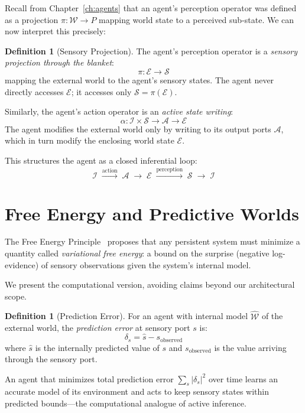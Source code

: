 \documentclass[11pt,a4paper,openany]{book}
\theoremstyle{plain}
\theoremstyle{definition}
\newtheorem{definition}[theorem]{Definition}
\theoremstyle{remark}
\newcommand{\world}{\ensuremath{\mathcal{W}}}
\begin{document}
Recall from Chapter~\ref{ch:agents} that an agent's perception operator
was defined as a projection $\pi : \world \to P$ mapping world state to
a perceived sub-state. We can now interpret this precisely:

\begin{definition}[Sensory Projection]
  The agent's perception operator is a \emph{sensory projection through
  the blanket}:
  \[
    \pi : \mathcal{E} \to \mathcal{S}
  \]
  mapping the external world to the agent's sensory states. The agent
  never directly accesses $\mathcal{E}$; it accesses only $\mathcal{S}
  = \pi(\mathcal{E})$.
\end{definition}

Similarly, the agent's action operator is an \emph{active state writing}:
\[
  \alpha : \mathcal{I} \times \mathcal{S} \to \mathcal{A} \to \mathcal{E}
\]
The agent modifies the external world only by writing to its output ports
$\mathcal{A}$, which in turn modify the enclosing world state $\mathcal{E}$.

This structures the agent as a closed inferential loop:
\[
  \mathcal{I} \;\xrightarrow{\text{action}}\; \mathcal{A}
  \;\to\; \mathcal{E}
  \;\xrightarrow{\text{perception}}\; \mathcal{S}
  \;\to\; \mathcal{I}
\]

\section{Free Energy and Predictive Worlds}

The Free Energy Principle~\cite{Friston} proposes that any persistent
system must minimize a quantity called \emph{variational free energy}:
a bound on the surprise (negative log-evidence) of sensory observations
given the system's internal model.

We present the computational version, avoiding claims beyond our
architectural scope.

\begin{definition}[Prediction Error]
  For an agent with internal model $\hat{\world}$ of the external world,
  the \emph{prediction error} at sensory port $s$ is:
  \[
    \delta_s = \hat{s} - s_{\text{observed}}
  \]
  where $\hat{s}$ is the internally predicted value of $s$ and
  $s_{\text{observed}}$ is the value arriving through the sensory port.
\end{definition}

An agent that minimizes total prediction error $\sum_s |\delta_s|^2$
over time learns an accurate model of its environment and acts to keep
sensory states within predicted bounds---the computational analogue of
active inference.
\end{document}
